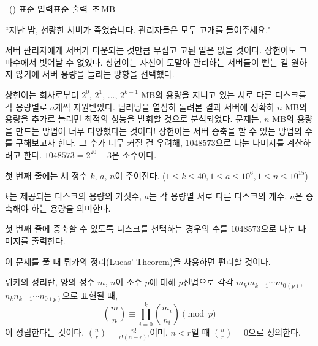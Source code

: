 \begin{problem}{\kcpcprobserver\ (\kcpcprobservershort)}
    {표준 입력}{표준 출력}
    {\kcpcprobservertime\,초}{\kcpcprobservermemory\,MB}{}
    
    ``지난 밤, 선량한 서버가 죽었습니다. 관리자들은 모두 고개를 들어주세요."
    
    서버 관리자에게 서버가 다운되는 것만큼 무섭고 고된 일은 없을 것이다. 상헌이도 그 마수에서 벗어날 수 없었다. 상헌이는 자신이 도맡아 관리하는 서버들이 뻗는 걸 원하지 않기에 서버 용량을 늘리는 방향을 선택했다.
    
    상헌이는 회사로부터 $2^0$, $2^1$, ..., $2^{k-1}$ MB의 용량을 지니고 있는 서로 다른 디스크를 각 용량별로 $a$개씩 지원받았다. 딥러닝을 열심히 돌려본 결과 서버에 정확히 $n$ MB의 용량을 추가로 늘리면 최적의 성능을 발휘할 것으로 분석되었다. 문제는, $n$ MB의 용량을 만드는 방법이 너무 다양했다는 것이다! 상헌이는 서버 증축을 할 수 있는 방법의 수를 구해보고자 한다. 그 수가 너무 커질 걸 우려해, $1048573$으로 나눈 나머지를 계산하려고 한다. 
    $1048573 = 2^{20} - 3$은 소수이다.
    
    \InputFile
    첫 번째 줄에는 세 정수 $k$, $a$, $n$이 주어진다. ($1 \leq k \leq 40, 1 \leq a \leq 10^6, 1 \leq n \leq 10^{15}$)
    
    $k$는 제공되는 디스크의 용량의 가짓수, $a$는 각 용량별 서로 다른 디스크의 개수, $n$은 증축해야 하는 용량을 의미한다.
    
    \OutputFile
    첫 번째 줄에 증축할 수 있도록 디스크를 선택하는 경우의 수를 $1048573$으로 나눈 나머지를 출력한다.
    
    \Examples
    \begin{example}
    \end{example}
    
    \Note
    이 문제를 풀 때 뤼카의 정리(Lucas' Theorem)을 사용하면 편리할 것이다. 
    
    뤼카의 정리란, 양의 정수 $m$, $n$이 소수 $p$에 대해 $p$진법으로 각각 $m_{k}m_{k-1}\cdots m_{0}{_{(p)}}$, $n_{k}n_{k-1}\cdots n_{0}{_{(p)}}$으로 표현될 때, $$\binom{m}{n} \equiv \prod_{i=0}^{k} \binom{m_i}{n_i} \pmod p$$이 성립한다는 것이다. $\binom{n}{r} = \frac{n!}{r!(n-r)!}$이며, $n < r$일 때 $\binom{n}{r} = 0$으로 정의한다.
    
\end{problem}


